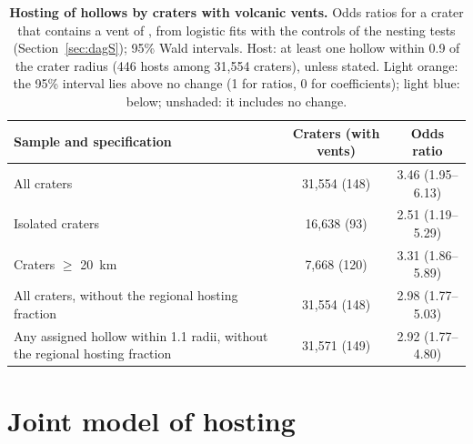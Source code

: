 \documentclass{planetary}
\begin{document}
\begin{table}[!ht]
    \mytablestyle
    \caption{{\bf Hosting of hollows by craters with volcanic vents.} Odds ratios for a crater that contains a vent of \textcite{pegg2021}, from logistic fits with the controls of the nesting tests (Section~\ref{sec:dagS}); 95\% Wald intervals. Host: at least one hollow within 0.9 of the crater radius (446 hosts among 31,554 craters), unless stated. Light orange: the 95\% interval lies above no change (1 for ratios, 0 for coefficients); light blue: below; unshaded: it includes no change.}
    \footnotesize{
        \begin{tabularx}{\textwidth}{>{\raggedright\arraybackslash}X c c}
            \toprule
            \textbf{Sample and specification} & \textbf{Craters (with vents)} & \textbf{Odds ratio} \\
            \hline
            All craters & 31,554 (148) & \cellcolor[HTML]{FBE3D6}3.46 (1.95--6.13) \\
            Isolated craters & 16,638 (93) & \cellcolor[HTML]{FBE3D6}2.51 (1.19--5.29) \\
            Craters $\geq$ 20~km & 7,668 (120) & \cellcolor[HTML]{FBE3D6}3.31 (1.86--5.89) \\
            All craters, without the regional hosting fraction & 31,554 (148) & \cellcolor[HTML]{FBE3D6}2.98 (1.77--5.03) \\
            Any assigned hollow within 1.1 radii, without the regional hosting fraction & 31,571 (149) & \cellcolor[HTML]{FBE3D6}2.92 (1.77--4.80) \\
            \hline
        \end{tabularx}}
    \label{tab:vents}
\end{table}

\clearpage

\section{Joint model of hosting}
\label{sec:jointS}
\end{document}
